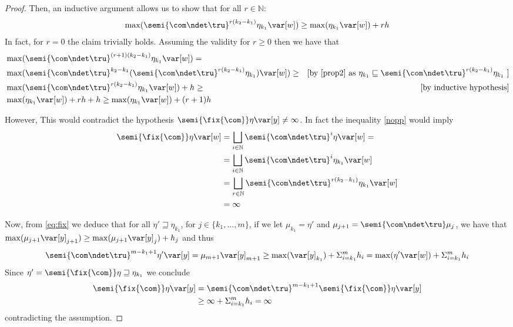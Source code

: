 \begin{proof}
  \noindent    
  Then, an inductive argument allows us to show that for all \(r \in \mathbb{N}\):
  \begin{equation}\label{nopp}
    \max(\semi{\com \ndet \tru}^{r(k_2-k_1)} \eta_{k_1} \var[w]) \geq \max(\eta_{k_1}
    \var[w]) + r h
  \end{equation}  
  In fact, for \(r=0\) the claim trivially holds. Assuming the
  validity for \(r\geq 0\) then we have that
  \begin{align*}    
    & \max(\semi{\com \ndet \tru}^{(r+1)(k_2-k_1)} \eta_{k_1} \var[w]) =\\
    &\max(\semi{\com \ndet \tru}^{k_2-k_1} ( \semi{\com \ndet \tru}^{r(k_2-k_1)} \eta_{k_1}) \var[w]) \geq & \mbox{[by \eqref{prop2} as \(\eta_{k_1} \sqsubseteq \semi{\com \ndet \tru}^{r(k_2-k_1)} \eta_{k_1}\) ]}\\
    &\max(\semi{\com \ndet \tru}^{r(k_2-k_1)} \eta_{k_1} \var[w]) + h \geq & \mbox{[by inductive hypothesis}]\\
    &  \max(\eta_{k_1}\var[w])  + rh + h
    \geq 
    \max(\eta_{k_1}\var[w])  + (r+1)h
  \end{align*}

  \noindent
  However, This would contradict the hypothesis
  \(\semi{\fix{\com}} \eta \var[y] \neq \infty\). In fact the
  inequality \eqref{nopp} would imply
  \begin{align*}
    \semi{\fix{\com}} \eta \var[w]
    & = \bigsqcup_{i \in \mathbb{N}} \semi{\com
      \ndet \tru}^i \eta \var[w] =\\ 
    & =  \bigsqcup_{i \in \mathbb{N}} \semi{\com \ndet
      \tru}^i \eta_{k_1} \var[w]\\ 
    & = \bigsqcup_{r \in \mathbb{N}} \semi{\com \ndet
      \tru}^{r(k_2-k_1)} \eta_{k_1} \var[w]\\
    & = \infty
  \end{align*}

  Now, from \eqref{eq:fix} we deduce that for all
  \(\eta' \sqsupseteq \eta_{k_1}\), for \(j \in \{ k_1, \ldots, m\}\),
  if we let \(\mu_{k_1} = \eta'\) and
  \(\mu_{j+1} = \semi{\com \ndet \tru} \mu_j\), we have that
  \(\max(\mu_{j+1} \var[y]_{j+1}) \geq \max(\mu_{j+1} \var[y]_{j}) +
  h_j\) and thus
  \[
  \semi{\com \ndet \tru}^{m-k_1+1} \eta' \var[y] = \mu_{m+1}
  \var[y]_{m+1} \geq 
  \max(\var[y]_{k_1}) + \Sigma_{i=k_1}^m h_i = \max(\eta' \var[w]) + \Sigma_{i=k_1}^m h_i
  \]
  Since \(\eta' = \semi{\fix{\com}} \eta \sqsupseteq \eta_{k_1}\) we conclude
  \begin{align*}
    \semi{\fix{\com}} \eta \var[y]
    & = \semi{\com \ndet \tru}^{m-k_1+1} \semi{\fix{\com}} \eta \var[y]\\
    & \geq \infty + \Sigma_{i=k_1}^m h_i = \infty
  \end{align*}
  contradicting the assumption.
  

\end{proof}
